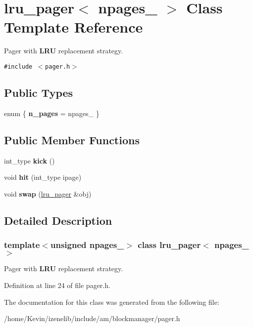 \hypertarget{classlru__pager}{
\section{lru\_\-pager$<$ npages\_\- $>$ Class Template Reference}
\label{classlru__pager}
}
Pager with {\bf LRU} replacement strategy.  


{\tt \#include $<$pager.h$>$}

\subsection*{Public Types}
\begin{CompactItemize}
\item 
enum \{ \textbf{n\_\-pages} =  npages\_\-
 \}
\end{CompactItemize}
\subsection*{Public Member Functions}
\begin{CompactItemize}
\item 
\hypertarget{classlru__pager_3dced37f4e36ac606bba0081d1d840c6}{
int\_\-type \textbf{kick} ()}
\label{classlru__pager_3dced37f4e36ac606bba0081d1d840c6}

\item 
\hypertarget{classlru__pager_3fc8a7d04b8a7f179a1c06929a1f70f9}{
void \textbf{hit} (int\_\-type ipage)}
\label{classlru__pager_3fc8a7d04b8a7f179a1c06929a1f70f9}

\item 
\hypertarget{classlru__pager_4eee5584279d1553e37c2b8089138b26}{
void \textbf{swap} (\hyperlink{classlru__pager}{lru\_\-pager} \&obj)}
\label{classlru__pager_4eee5584279d1553e37c2b8089138b26}

\end{CompactItemize}


\subsection{Detailed Description}
\subsubsection*{template$<$unsigned npages\_\-$>$ class lru\_\-pager$<$ npages\_\- $>$}

Pager with {\bf LRU} replacement strategy. 

Definition at line 24 of file pager.h.

The documentation for this class was generated from the following file:\begin{CompactItemize}
\item 
/home/Kevin/izenelib/include/am/blockmanager/pager.h\end{CompactItemize}
